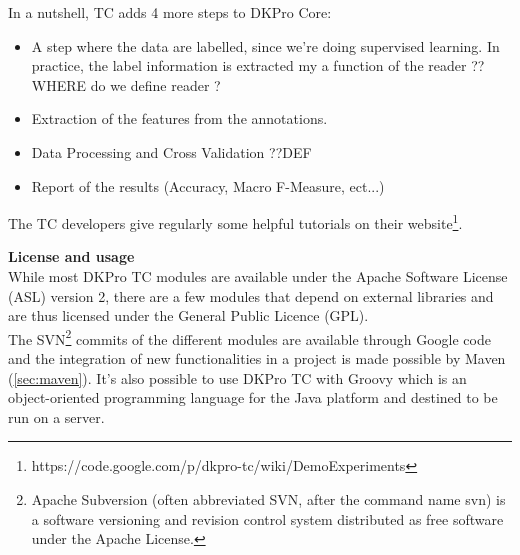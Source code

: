 In a nutshell, TC adds 4 more steps to DKPro Core:
  \begin{itemize}
  \item A step where the data are labelled, since we're doing supervised learning. In practice, the label information is extracted my a function of the reader ??WHERE do we define reader ?
  \item Extraction of the features from the annotations.
  \item Data Processing and Cross Validation ??DEF 
  \item Report of the results (Accuracy, Macro F-Measure, ect...)
\end{itemize}  

The TC developers give regularly some helpful tutorials on their website\footnote{https://code.google.com/p/dkpro-tc/wiki/DemoExperiments}. 
\
\vspace{0.2cm}

\textbf{License and usage}
\\
While most DKPro TC modules are available under the Apache Software License (ASL) version 2, there are a few modules that depend on external libraries and are thus licensed under the General Public Licence (GPL). 
\\
The SVN\footnote{Apache Subversion (often abbreviated SVN, after the command name svn) is a software versioning and revision control system distributed as free software under the Apache License.} commits of the different modules are available through Google code and the integration of new functionalities in a project is made possible by Maven (\cref{sec:maven}). It's also possible to use DKPro TC with Groovy which is an object-oriented programming language for the Java platform and destined to be run on a server. 

















